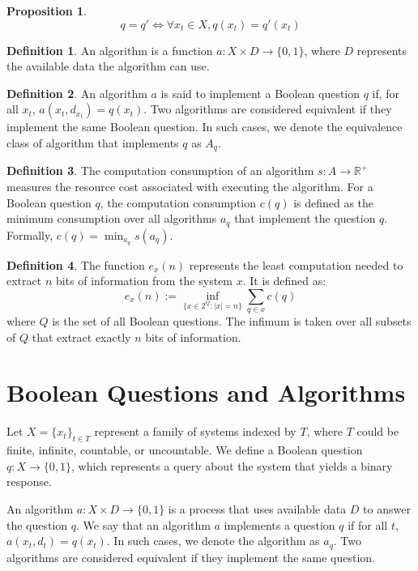 \documentclass[11pt,a4paper]{article}
\newtheorem{pro}{Proposition}[section]
\theoremstyle{definition}
\newtheorem{defn}{Definition}[section]
\theoremstyle{remark}
\numberwithin{equation}{section}
\begin{document}
\begin{pro}
\begin{equation}
q=q' \iff  \forall x_t \in X, q(x_t) = q'(x_t)
\end{equation}
\end{pro}

\begin{defn}
An algorithm is a function \( a: X \times D \rightarrow \{0, 1\} \), where \( D \) represents the available data the algorithm can use.
\end{defn}
\begin{defn}
An algorithm \( a \) is said to implement a Boolean question \( q \) if, for all \( x_t \), \( a(x_t, d_{x_t}) = q(x_t) \).
Two algorithms are considered equivalent if they implement the same Boolean question. In such cases, we denote the equivalence class of algorithm that implements $q$ as \( A_q \).
\end{defn}

\begin{defn}
The computation consumption of an algorithm \( s: A \rightarrow \mathbb{R}^+ \) measures the resource cost associated with executing the algorithm.
For a Boolean question \( q \), the computation consumption \( c(q) \) is defined as the minimum consumption over all algorithms \( a_q \) that implement the question \( q \).
Formally, \( c(q) = \min_{a_q} s(a_q) \).
\end{defn}

\begin{defn}
The function \( e_x(n) \) represents the least computation needed to extract \( n \) bits of information from the system \( x \).
It is defined as:
\[
e_x(n) := \inf_{\{x \in 2^Q : |x| = n\}} \sum_{q \in x} c(q)
\]
where \( Q \) is the set of all Boolean questions.
The infimum is taken over all subsets of \( Q \) that extract exactly \( n \) bits of information.
\end{defn}



\section{Boolean Questions and Algorithms}
Let \(X = \{x_t\}_{t \in T}\) represent a family of systems indexed by \(T\), where \(T\) could be finite, infinite, countable, or uncountable. We define a Boolean question \(q: X \rightarrow \{0, 1\}\), which represents a query about the system that yields a binary response.

An algorithm \(a: X \times D \rightarrow \{0, 1\}\) is a process that uses available data \(D\) to answer the question \(q\). We say that an algorithm \(a\) implements a question \(q\) if for all \(t\), \(a(x_t, d_t) = q(x_t)\). In such cases, we denote the algorithm as \(a_q\). Two algorithms are considered equivalent if they implement the same question.
\end{document}
